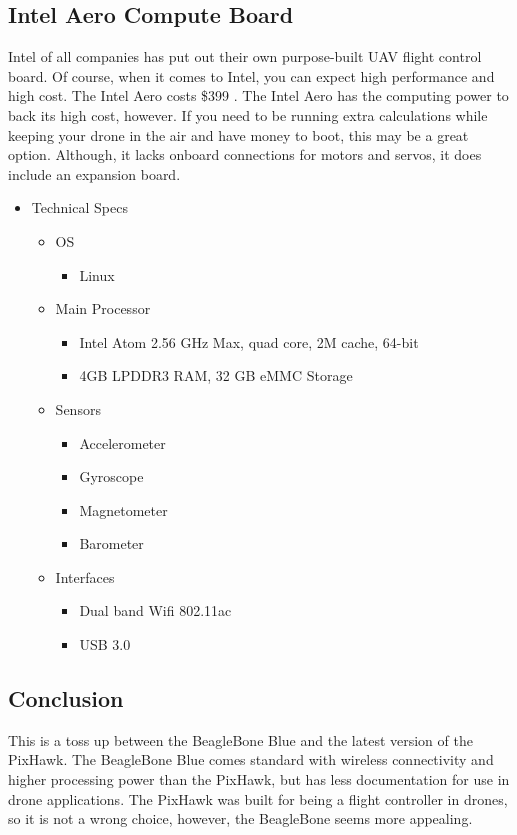 \documentclass[onecolumn, 10pt, compsoc]{IEEEtran}
\begin{document}
\subsection{Intel Aero Compute Board}
Intel of all companies has put out their own purpose-built UAV flight control board. Of course, when it comes to Intel, you can expect high performance and high cost. The Intel Aero costs \$399 \cite{IntelAero}. The Intel Aero has the computing power to back its high cost, however. If you need to be running extra calculations while keeping your drone in the air and have money to boot, this may be a great option. Although, it lacks onboard connections for motors and servos, it does include an expansion board. 
\begin{itemize}
    \item Technical Specs \cite{IntelAero}
    \begin{itemize}
        \item OS
        \begin{itemize}
            \item Linux
        \end{itemize}
        \item Main Processor
        \begin{itemize}
            \item Intel Atom 2.56 GHz Max, quad core, 2M cache, 64-bit
            \item 4GB LPDDR3 RAM, 32 GB eMMC Storage
        \end{itemize}
        \item Sensors
        \begin{itemize}
            \item Accelerometer
            \item Gyroscope
            \item Magnetometer
            \item Barometer
        \end{itemize}
        \item Interfaces
        \begin{itemize}
            \item Dual band Wifi 802.11ac
            \item USB 3.0
        \end{itemize}
    \end{itemize}
\end{itemize}
\subsection{Conclusion}
This is a toss up between the BeagleBone Blue and the latest version of the PixHawk. The BeagleBone Blue comes standard with wireless connectivity and higher processing power than the PixHawk, but has less documentation for use in drone applications. The PixHawk was built for being a flight controller in drones, so it is not a wrong choice, however, the BeagleBone seems more appealing.
\end{document}
